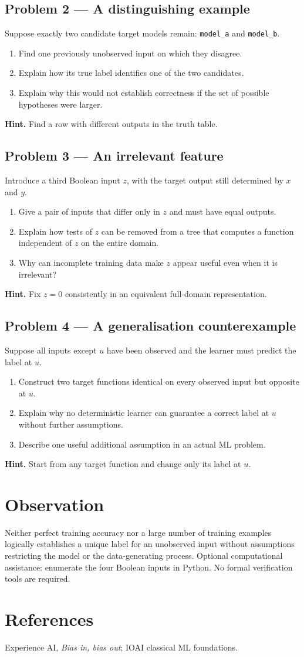 \documentclass[11pt,a4paper]{article}
\newcommand{\problem}[1]{\subsection*{Problem #1}}
\begin{document}
\problem{2 --- A distinguishing example}
Suppose exactly two candidate target models remain: \texttt{model\_a} and \texttt{model\_b}.
\begin{enumerate}[label=(\alph*)]
\item Find one previously unobserved input on which they disagree.
\item Explain how its true label identifies one of the two candidates.
\item Explain why this would not establish correctness if the set of possible hypotheses were larger.
\end{enumerate}
\textbf{Hint.} Find a row with different outputs in the truth table.

\problem{3 --- An irrelevant feature}
Introduce a third Boolean input $z$, with the target output still determined by $x$ and $y$.
\begin{enumerate}[label=(\alph*)]
\item Give a pair of inputs that differ only in $z$ and must have equal outputs.
\item Explain how tests of $z$ can be removed from a tree that computes a function independent of $z$ on the entire domain.
\item Why can incomplete training data make $z$ appear useful even when it is irrelevant?
\end{enumerate}
\textbf{Hint.} Fix $z=0$ consistently in an equivalent full-domain representation.

\problem{4 --- A generalisation counterexample}
Suppose all inputs except $u$ have been observed and the learner must predict the label at $u$.
\begin{enumerate}[label=(\alph*)]
\item Construct two target functions identical on every observed input but opposite at $u$.
\item Explain why no deterministic learner can guarantee a correct label at $u$ without further assumptions.
\item Describe one useful additional assumption in an actual ML problem.
\end{enumerate}
\textbf{Hint.} Start from any target function and change only its label at $u$.

\section*{Observation}
Neither perfect training accuracy nor a large number of training examples logically establishes a unique label for an unobserved input without assumptions restricting the model or the data-generating process. Optional computational assistance: enumerate the four Boolean inputs in Python. No formal verification tools are required.

\section*{References}
Experience AI, \emph{Bias in, bias out}; IOAI classical ML foundations.
\end{document}
